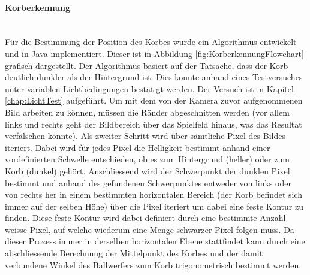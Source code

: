 	\paragraph{Korberkennung}$~~$\vspace{2mm}\\
		Für die Bestimmung der Position des Korbes wurde ein Algorithmus 
		entwickelt und in Java implementiert. Dieser ist in Abbildung 
		\ref{fig:KorberkennungFlowchart} grafisch dargestellt. Der Algorithmus 
		basiert auf der Tatsache, dass der Korb deutlich dunkler als der 
		Hintergrund ist. Dies konnte anhand eines Testversuches unter variablen 
		Lichtbedingungen bestätigt werden. Der Versuch ist in Kapitel 
		\ref{chap:LichtTest} aufgeführt. Um mit dem von der Kamera zuvor 
		aufgenommenen Bild arbeiten zu können, müssen die Ränder abgeschnitten 
		werden (vor allem links und rechts geht der Bildbereich über das Spielfeld 
		hinaus, was das Resultat verfälschen könnte). Als zweiter Schritt wird 
		über sämtliche Pixel des Bildes iteriert. Dabei wird für jedes Pixel die 
		Helligkeit bestimmt anhand einer vordefinierten Schwelle entschieden, 
		ob es zum Hintergrund (heller) oder zum Korb (dunkel) gehört. Anschliessend 
		wird der Schwerpunkt der dunklen Pixel bestimmt und anhand des gefundenen 
		Schwerpunktes entweder von links oder von rechts her in einem bestimmten 
		horizontalen Bereich (der Korb befindet sich immer auf der selben Höhe)
		über die Pixel iteriert um dabei eine feste Kontur zu finden. Diese feste 
		Kontur wird dabei definiert durch eine bestimmte Anzahl weisse Pixel, auf 
		welche wiederum eine Menge schwarzer Pixel folgen muss. Da dieser Prozess 
		immer in derselben horizontalen Ebene stattfindet kann durch eine 
		abschliessende Berechnung der Mittelpunkt des Korbes und der damit 
		verbundene Winkel des Ballwerfers zum Korb trigonometrisch bestimmt werden.
